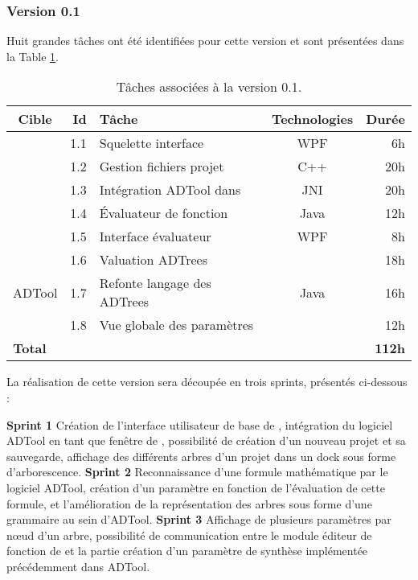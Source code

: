 		\subsubsection{Version 0.1}
			Huit grandes tâches ont été identifiées pour cette version et sont présentées dans la {\sc Table} \ref{tab:taches_units_1}. 
			\begin{table}[H]
				\centering
				\begin{tabular}{|c|r|l|c|r|}
					\hline
					\textbf{Cible} & \textbf{Id} & \textbf{Tâche} & \textbf{Technologies} & \textbf{Durée}\\
					\hline

					\multirow{5}{*}{\glasir{}} & 1.1 & Squelette interface & WPF & 6h\\
					\cline{2-5}
					 & 1.2 & Gestion fichiers projet & C++ & 20h\\
					\cline{2-5}
					 & 1.3 & Intégration ADTool dans \glasir & JNI & 20h\\
					\cline{2-5}
					 & 1.4 & \'Evaluateur de fonction & Java & 12h\\
					\cline{2-5}
					 & 1.5 & Interface évaluateur & WPF & 8h\\
					\hline

					\multirow{3}{*}{ADTool} & 1.6 & Valuation ADTrees & \multirow{3}{*}{Java} & 18h\\
					\cline{2-3} \cline{5-5}
					 & 1.7 & Refonte langage des ADTrees & & 16h\\
					\cline{2-3} \cline{5-5}
					 & 1.8 & Vue globale des paramètres & & 12h\\
					\hline

					\multicolumn{4}{|l|}{\bf Total} & {\bf 112h}\\
					\hline
				\end{tabular}
				\caption{Tâches associées à la version 0.1.}
				\label{tab:taches_units_1}
			\end{table}
			
			
			La réalisation de cette version sera découpée en trois sprints, présentés ci-dessous :

			\noindent\textbf{Sprint 1} Création de l'interface utilisateur de base de \glasir{}, intégration du logiciel ADTool en tant que fenêtre de \glasir{}, possibilité de création d'un nouveau projet et sa sauvegarde, affichage des différents arbres d'un projet dans un dock sous forme d'arborescence.\newline
			\textbf{Sprint 2} Reconnaissance d'une formule mathématique par le logiciel ADTool, création d'un paramètre en fonction de l'évaluation de cette formule, et l'amélioration de la représentation des arbres sous forme d'une grammaire au sein d'ADTool.\newline
			\textbf{Sprint 3} Affichage de plusieurs paramètres par nœud d'un arbre, possibilité de communication entre le module éditeur de fonction de \glasir{} et la partie création d'un paramètre de synthèse implémentée précédemment dans ADTool.\newline


